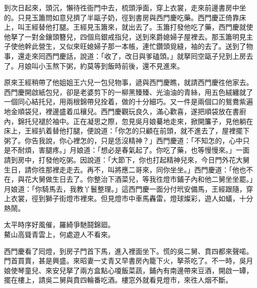 到次日起來，頭沉，懶待徃衙門中去，梳頭淨面，穿上衣裳，走來前邊書房中坐的。只見玉簫問如意兒擠了半甌子奶，徑到書房與西門慶吃藥。西門慶正倚靠床上，叫王經替他打腿。王經見玉簫來，就出去了。玉簫打發他吃了藥，西門慶就使他拏了一對金鑲頭簪兒，四個烏銀戒指兒，送到來爵媳婦子屋裡去。那玉簫明見主子使他幹此營生，又似來旺媳婦子那一本帳，{}連忙鑽頭覓縫，袖的去了。送到了物事，還走來囘西門慶話，說道：「收了，改日與爹磕頭。」就拏囘空甌子兒到上房去了。月娘叫小玉熬下粥，約莫等到飯時前後，還不見進來。

原來王經稍帶了他姐姐王六兒一包兒物事，遞與西門慶瞧，就請西門慶徃他家去。西門慶開啟紙包兒，卻是老婆剪下的一柳黑臻臻、光油油的青絲，用五色絨纏就了一個同心結托兒，用兩根錦帶兒拴着，做的十分細巧。{}又一件是兩個口的鴛鴦紫遍地金順袋兒，裡邊盛着瓜穰兒。西門慶觀玩良久，滿心歡喜，遂把順袋放在書廚內，錦托兒褪於袖中。正在凝思之際，忽見吳月娘驀地走來，掀開簾子，見他躺在床上，王經扒着替他打腿，便說道：「你怎的只顧在前頭，就不進去了，屋裡擺下粥了。你告我說，你心裡怎的，只是恁沒精神？」{}西門慶道：「不知怎的，心中只是不耐煩，害腿疼。」月娘道：「想必是春氣起了。你吃了藥，也等慢慢來。」一面請到房中，打發他吃粥。因說道：「大節下，你也打起精神兒來，今日門外花大舅生日，請你徃那裡走走去。再不，叫將應二哥來，同你坐坐。」西門慶道：「他也不在，與花大舅做生日去了。你整治下酒菜兒，等我徃燈市鋪子內和他二舅坐坐罷。」月娘道：「你騎馬去，我教丫鬟整理。」這西門慶一面分付玳安備馬，王經跟隨，穿上衣裳，徑到獅子街燈市裡來。但見燈市中車馬轟雷，燈球燦彩，遊人如蟻，十分熱鬧。

\begin{myquote} 
太平時序好風催，羅綺爭馳鬪錦廻。\\鰲山高聳青雲上，何處遊人不看來。
\end{myquote} 

西門慶看了囘燈，到房子門首下馬，進入裡面坐下。慌的吳二舅、賁四都來聲喏。門首買賣，甚是興盛。來昭妻一丈青又早書房內籠下火，拏茶吃了。不一時，吳月娘使琴童兒、來安兒拏了兩方盒點心嗄飯菜蔬，鋪內有南邊帶來豆酒，開啟一罈，擺在樓上，請吳二舅與賁四輪番吃酒。樓窓外就看見燈市，來徃人烟不斷。

